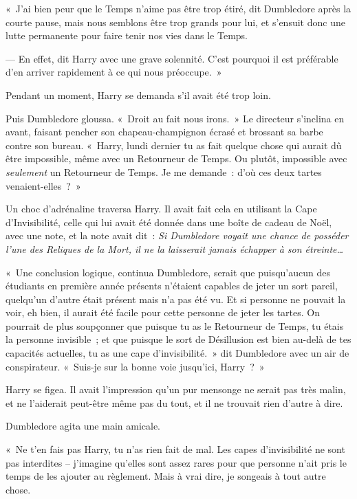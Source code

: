 «~J'ai bien peur que le Temps n'aime pas être trop étiré, dit Dumbledore après la courte pause, mais nous semblons être trop grands pour lui, et s'ensuit donc une lutte permanente pour faire tenir nos vies dans le Temps.

--- En effet, dit Harry avec une grave solennité. C'est pourquoi il est préférable d'en arriver rapidement à ce qui nous préoccupe.~»

Pendant un moment, Harry se demanda s'il avait été trop loin.

Puis Dumbledore gloussa. «~Droit au fait nous irons.~» Le directeur s'inclina en avant, faisant pencher son chapeau-champignon écrasé et brossant sa barbe contre son bureau. «~Harry, lundi dernier tu as fait quelque chose qui aurait dû être impossible, même avec un Retourneur de Temps. Ou plutôt, impossible avec \emph{seulement} un Retourneur de Temps. Je me demande~: d'où ces deux tartes venaient-elles~?~»

Un choc d'adrénaline traversa Harry. Il avait fait cela en utilisant la Cape d'Invisibilité, celle qui lui avait été donnée dans une boîte de cadeau de Noël, avec une note, et la note avait dit~: \emph{Si Dumbledore voyait une chance de posséder l'une des Reliques de la Mort, il ne la laisserait jamais échapper à son étreinte…}

«~Une conclusion logique, continua Dumbledore, serait que puisqu'aucun des étudiants en première année présents n'étaient capables de jeter un sort pareil, quelqu'un d'autre était présent mais n'a pas été vu. Et si personne ne pouvait la voir, eh bien, il aurait été facile pour cette personne de jeter les tartes. On pourrait de plus soupçonner que puisque tu as le Retourneur de Temps, tu étais la personne invisible~; et que puisque le sort de Désillusion est bien au-delà de tes capacités actuelles, tu as une cape d'invisibilité.~» dit Dumbledore avec un air de conspirateur. «~Suis-je sur la bonne voie jusqu'ici, Harry~?~»

Harry se figea. Il avait l'impression qu'un pur mensonge ne serait pas très malin, et ne l'aiderait peut-être même pas du tout, et il ne trouvait rien d'autre à dire.

Dumbledore agita une main amicale.

«~Ne t'en fais pas Harry, tu n'as rien fait de mal. Les capes d'invisibilité ne sont pas interdites -- j'imagine qu'elles sont assez rares pour que personne n'ait pris le temps de les ajouter au règlement. Mais à vrai dire, je songeais à tout autre chose.

